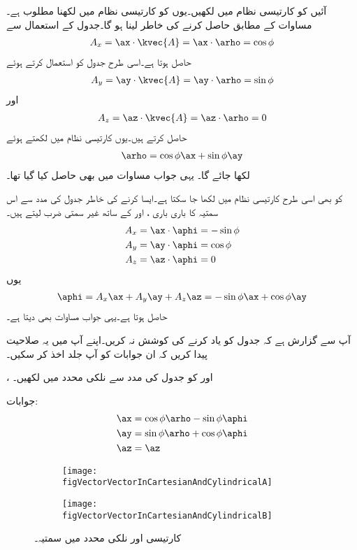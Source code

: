 آئیں  کو کارتیسی نظام میں لکھیں۔یوں  کو  کارتیسی نظام میں لکھنا مطلوب ہے۔مساوات  کے مطابق   حاصل کرنے کی خاطر  لینا ہو گا۔جدول  کے استعمال سے
\begin{align*}
A_x=\ax \cdot \kvec{A}=\ax \cdot \arho=\cos \phi
\end{align*}  
حاصل ہوتا ہے۔اسی طرح جدول کو استعمال کرتے ہوئے
\begin{align*}
A_y=\ay \cdot \kvec{A}=\ay \cdot \arho=\sin \phi
\end{align*}
اور 
\begin{align*}
A_z=\az \cdot \kvec{A}=\az \cdot \arho=0
\end{align*}
حاصل کرتے  ہیں۔یوں کارتیسی نظام میں  لکھتے ہوئے
\begin{align*}
\arho = \cos \phi \ax +\sin \phi \ay
\end{align*}
لکھا جائے گا۔ یہی جواب مساوات  میں بھی حاصل کیا گیا تھا۔

 کو بھی اسی طرح کارتیسی نظام میں لکھا جا سکتا ہے۔ایسا کرنے کی خاطر جدول  کی مدد سے  اس سمتیہ کا باری باری ،  اور  کے ساتھ غیر سمتی ضرب لیتے ہیں۔
\begin{align*}
A_x&=\ax \cdot \aphi=-\sin \phi\\
A_y&=\ay \cdot \aphi=\cos \phi\\
A_z&=\az \cdot \aphi=0
\end{align*}
یوں
\begin{align*}
\aphi=A_x \ax+A_y \ay+A_z \az = -\sin \phi \ax+\cos \phi \ay
\end{align*}
حاصل ہوتا ہے۔یہی جواب مساوات  بھی دیتا ہے۔

آپ سے گزارش ہے کہ جدول  کو یاد کرنے کی کوشش نہ کریں۔اپنے آپ میں یہ صلاحیت پیدا کریں کہ ان جوابات کو آپ جلد اخذ کر سکیں۔

،  اور  کو جدول  کی مدد سے  نلکی محدد میں لکھیں۔

جوابات:
\begin{align*}
\ax&=\cos \phi \arho-\sin \phi \aphi\\
\ay&=\sin \phi \arho+\cos \phi \aphi\\
\az&=\az
\end{align*}
%
\begin{figure}
\centering
\begin{subfigure}{0.4\textwidth}
\centering
\texttt{[image: figVectorVectorInCartesianAndCylindricalA]}
\end{subfigure}%
%
\begin{subfigure}{0.4\textwidth}
\centering
\texttt{[image: figVectorVectorInCartesianAndCylindricalB]}
\end{subfigure}%
\caption{کارتیسی اور نلکی محدد میں سمتیہ۔}
\label{شکل_سمتیہ_کارتیسی_نلکی_مساوات}
\end{figure}

